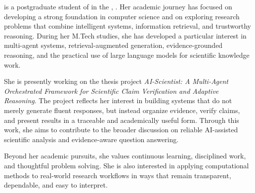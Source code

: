 
\textbf{\ThesisAuthorName} is a postgraduate student of \textbf{\ThesisProgram} in the
\textbf{\ThesisDepartment}, \textbf{\ThesisInstitute}. Her academic journey has focused on developing a strong
foundation in computer science and on exploring research problems that combine intelligent systems, information
retrieval, and trustworthy reasoning. During her M.Tech studies, she has developed a particular interest in
multi-agent systems, retrieval-augmented generation, evidence-grounded reasoning, and the practical use of large
language models for scientific knowledge work.

She is presently working on the thesis project \emph{AI-Scientist: A Multi-Agent Orchestrated Framework for
Scientific Claim Verification and Adaptive Reasoning}. The project reflects her interest in building systems that
do not merely generate fluent responses, but instead organize evidence, verify claims, and present results in a
traceable and academically useful form. Through this work, she aims to contribute to the broader discussion on
reliable AI-assisted scientific analysis and evidence-aware question answering.

Beyond her academic pursuits, she values continuous learning, disciplined work, and thoughtful problem solving.
She is also interested in applying computational methods to real-world research workflows in ways that remain
transparent, dependable, and easy to interpret.
\clearpage
